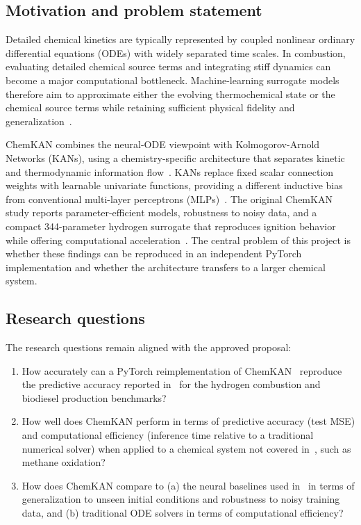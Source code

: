 \documentclass[11pt,a4paper]{article}
\begin{document}
\subsection{Motivation and problem statement}

Detailed chemical kinetics are typically represented by coupled nonlinear ordinary differential equations (ODEs) with widely separated time scales. In combustion, evaluating detailed chemical source terms and integrating stiff dynamics can become a major computational bottleneck. Machine-learning surrogate models therefore aim to approximate either the evolving thermochemical state or the chemical source terms while retaining sufficient physical fidelity and generalization~\cite{Koenig_2025,OWOYELE2022100118}.

ChemKAN combines the neural-ODE viewpoint with Kolmogorov-Arnold Networks (KANs), using a chemistry-specific architecture that separates kinetic and thermodynamic information flow~\cite{Koenig_2025}. KANs replace fixed scalar connection weights with learnable univariate functions, providing a different inductive bias from conventional multi-layer perceptrons (MLPs)~\cite{ICLR2025_afaed896}. The original ChemKAN study reports parameter-efficient models, robustness to noisy data, and a compact 344-parameter hydrogen surrogate that reproduces ignition behavior while offering computational acceleration~\cite{Koenig_2025}. The central problem of this project is whether these findings can be reproduced in an independent PyTorch implementation and whether the architecture transfers to a larger chemical system.

\subsection{Research questions}

The research questions remain aligned with the approved proposal:

\begin{enumerate}[label=\textbf{RQ\arabic*:}]
  \item How accurately can a PyTorch reimplementation of ChemKAN~\cite{Koenig_2025} reproduce the predictive accuracy reported in~\cite{Koenig_2025} for the hydrogen combustion and biodiesel production benchmarks?

  \item How well does ChemKAN perform in terms of predictive accuracy (test MSE) and computational efficiency (inference time relative to a traditional numerical solver) when applied to a chemical system not covered in~\cite{Koenig_2025}, such as methane oxidation?

  \item How does ChemKAN compare to (a) the neural baselines used in~\cite{Koenig_2025} in terms of generalization to unseen initial conditions and robustness to noisy training data, and (b) traditional ODE solvers in terms of computational efficiency?
\end{enumerate}
\end{document}
